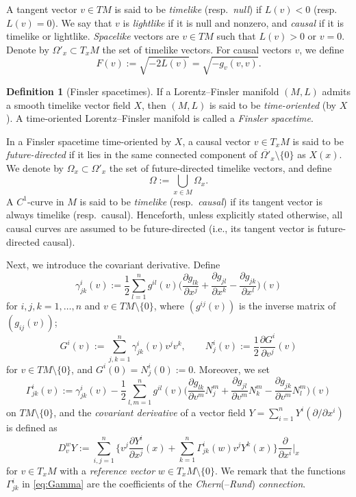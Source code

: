 \documentclass[a4paper,11pt]{article}
\numberwithin{equation}{section}
\theoremstyle{definition}
\newtheorem{definition}{Definition}[section]
\theoremstyle{plain}
\newcommand{\del}{\partial}
\begin{document}
A tangent vector $v \in TM $ is said to be \emph{timelike} (resp.\ \emph{null})
if $L(v)<0$ (resp.\ $L(v)=0$).
We say that $v$ is \emph{lightlike} if it is null and nonzero, and \emph{causal} if it is timelike or lightlike.
\emph{Spacelike} vectors are $v \in TM$ such that $L(v)>0$ or $v=0$.
Denote by $\Omega'_x \subset T_xM$ the set of timelike vectors.
For causal vectors $v$, we define
\begin{equation}\label{eq:LtoF}
F(v) :=\sqrt{-2L(v)} =\sqrt{-g_v(v,v)}.
\end{equation}

\begin{definition}[Finsler spacetimes]\label{df:Fspt}
If a Lorentz--Finsler manifold $(M,L)$ admits a smooth timelike vector field $X$,
then $(M,L)$ is said to be \emph{time-oriented} (by $X$).
A time-oriented Lorentz--Finsler manifold is called a \emph{Finsler spacetime}.
\end{definition}

In a Finsler spacetime time-oriented by $X$,
a causal vector $v \in T_xM$ is said to be \emph{future-directed}
if it lies in the same connected component of $\overline{\Omega'}\!_x \setminus \{0\}$ as $X(x)$.
We denote by $\Omega_x \subset \Omega'_x$ the set of future-directed timelike vectors,
and define
\[ \Omega :=\bigcup_{x \in M} \Omega_x. \]
A $C^1$-curve in $M$ is said to be \emph{timelike} (resp.\ \emph{causal})
if its tangent vector is always timelike (resp.\ causal).
Henceforth, unless explicitly stated otherwise, all causal curves are assumed to be future-directed (i.e., its tangent vector is future-directed causal).

Next, we introduce the covariant derivative.
Define
\[ \gamma^i_{jk} (v)
 :=\frac{1}{2} \sum_{l=1}^n g^{il}(v)
 \biggl( \frac{\del g_{lk}}{\del x^j} +\frac{\del g_{jl}}{\del x^k} -\frac{\del g_{jk}}{\del x^l} \biggr)(v) \]
for $i,j,k =1,\ldots,n$ and $v \in TM\setminus \{0\}$,
where $(g^{ij}(v))$ is the inverse matrix of $(g_{ij}(v))$;
\[ G^i(v) :=\sum_{j,k=1}^n \gamma^i_{jk}(v) v^j v^k, \qquad
N^i_j(v) :=\frac{1}{2}\frac{\del G^i}{\del v^j}(v) \]
for $v \in TM \setminus \{0\}$, and $G^i(0)=N^i_j(0):=0$.
Moreover, we set
\begin{equation}\label{eq:Gamma}
\Gamma^i_{jk}(v)
 :=\gamma^i_{jk}(v) -\frac{1}{2}\sum_{l,m=1}^n g^{il}(v)
 \biggl( \frac{\del g_{lk}}{\del v^m}N^m_j +\frac{\del g_{jl}}{\del v^m} N^m_k
 -\frac{\del g_{jk}}{\del v^m} N^m_l \biggr)(v)
\end{equation}
on $TM \setminus \{0\}$,
and the \emph{covariant derivative} of a vector field $Y=\sum_{i=1}^n Y^i (\del/\del x^i)$ is defined as
\[ D_v^w Y :=\sum_{i,j=1}^n
 \Biggl\{ v^j \frac{\del Y^i}{\del x^j}(x)
 +\sum_{k=1}^n \Gamma^i_{jk}(w) v^j Y^k(x) \Biggr\}
 \frac{\del}{\del x^i} \bigg|_x \]
for $v \in T_xM$ with a \emph{reference vector} $w \in T_xM \setminus \{0\}$.
We remark that the functions $\Gamma^i_{jk}$ in \eqref{eq:Gamma} are the coefficients
of the \emph{Chern}(--\emph{Rund}) \emph{connection}.
\end{document}
